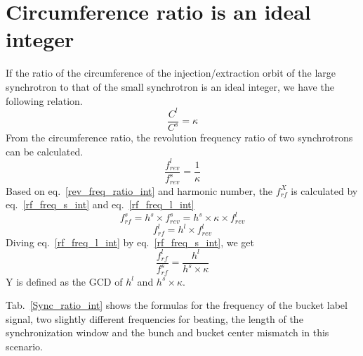 %
%
% 
%
\section{ Circumference ratio is an ideal integer}

If the ratio of the circumference of the injection/extraction orbit of the large synchrotron to that of the small synchrotron is an ideal integer, we have the following relation. 
\begin{equation}
\frac{C^l}{C^s}=\kappa \label{circumference_ratio_int}
\end{equation}
From the circumference ratio, the revolution frequency ratio of two synchrotrons can be calculated.
\begin{equation}
\frac{f_{rev}^{l}}{f_{rev}^{s}}=\frac{1}{\kappa} \label{rev_freq_ratio_int}
\end{equation}
Based on eq.~\ref{rev_freq_ratio_int} and harmonic number, the $f_{rf}^{X}$ is calculated by eq.~\ref{rf_freq_s_int} and eq.~\ref{rf_freq_l_int}
\begin{equation} 
f_{rf}^{s}= h^s \times f_{rev}^{s}=h^s \times \kappa \times f_{rev}^{l} \label{rf_freq_s_int}
\end{equation}
\begin{equation} 
f_{rf}^{l}= h^l \times f_{rev}^{l} \label{rf_freq_l_int}
\end{equation}
Diving eq.~\ref{rf_freq_l_int} by eq.~\ref{rf_freq_s_int}, we get
\begin{equation} 
\frac{f_{rf}^{l}}{f_{rf}^{s}}= \frac{h^l}{h^s \times \kappa} \label{rf_freq_ratio}
\end{equation}
Y is defined as the \gls{GCD} of $h^l$ and $h^s \times \kappa$.

Tab.~\ref{Sync_ratio_int} shows the formulas for the frequency of the bucket label signal, two slightly different frequencies for beating, the length of the synchronization window and the bunch and bucket center mismatch in this scenario.

